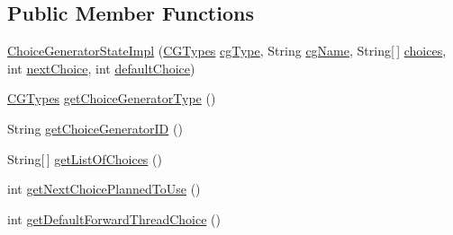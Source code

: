 \subsection*{Public Member Functions}
\begin{DoxyCompactItemize}
\item 
\hyperlink{classgov_1_1nasa_1_1jpf_1_1inspector_1_1server_1_1choicegenerators_1_1_choice_generator_state_impl_a5a377cd646c3366371214305f4c4dbea}{Choice\+Generator\+State\+Impl} (\hyperlink{enumgov_1_1nasa_1_1jpf_1_1inspector_1_1interfaces_1_1_choice_generators_interface_1_1_c_g_types}{C\+G\+Types} \hyperlink{classgov_1_1nasa_1_1jpf_1_1inspector_1_1server_1_1choicegenerators_1_1_choice_generator_state_impl_a5d7f2a3bd122308e6e9a169418389ca7}{cg\+Type}, String \hyperlink{classgov_1_1nasa_1_1jpf_1_1inspector_1_1server_1_1choicegenerators_1_1_choice_generator_state_impl_a238a8f39d5e053f72aedb9581929a0da}{cg\+Name}, String\mbox{[}$\,$\mbox{]} \hyperlink{classgov_1_1nasa_1_1jpf_1_1inspector_1_1server_1_1choicegenerators_1_1_choice_generator_state_impl_a1b6cb0074743d6d984f3a0cac6858a45}{choices}, int \hyperlink{classgov_1_1nasa_1_1jpf_1_1inspector_1_1server_1_1choicegenerators_1_1_choice_generator_state_impl_ac8fb04c5a3d70c3f32cd001050019044}{next\+Choice}, int \hyperlink{classgov_1_1nasa_1_1jpf_1_1inspector_1_1server_1_1choicegenerators_1_1_choice_generator_state_impl_a2d4c8c4cbf01db6442c408e1994be685}{default\+Choice})
\item 
\hyperlink{enumgov_1_1nasa_1_1jpf_1_1inspector_1_1interfaces_1_1_choice_generators_interface_1_1_c_g_types}{C\+G\+Types} \hyperlink{classgov_1_1nasa_1_1jpf_1_1inspector_1_1server_1_1choicegenerators_1_1_choice_generator_state_impl_aecc3d03f3d0ba0d297b3fceb7ad93787}{get\+Choice\+Generator\+Type} ()
\item 
String \hyperlink{classgov_1_1nasa_1_1jpf_1_1inspector_1_1server_1_1choicegenerators_1_1_choice_generator_state_impl_a20d2368b1f5d2414fd5789745c1b7d37}{get\+Choice\+Generator\+ID} ()
\item 
String\mbox{[}$\,$\mbox{]} \hyperlink{classgov_1_1nasa_1_1jpf_1_1inspector_1_1server_1_1choicegenerators_1_1_choice_generator_state_impl_ae614d3e9025fb1210eb8a41edb184560}{get\+List\+Of\+Choices} ()
\item 
int \hyperlink{classgov_1_1nasa_1_1jpf_1_1inspector_1_1server_1_1choicegenerators_1_1_choice_generator_state_impl_a2959222c26ab47275f0ec6560c78afd7}{get\+Next\+Choice\+Planned\+To\+Use} ()
\item 
int \hyperlink{classgov_1_1nasa_1_1jpf_1_1inspector_1_1server_1_1choicegenerators_1_1_choice_generator_state_impl_a9b3a7a7584175195d204eeb81956b197}{get\+Default\+Forward\+Thread\+Choice} ()
\end{DoxyCompactItemize}
